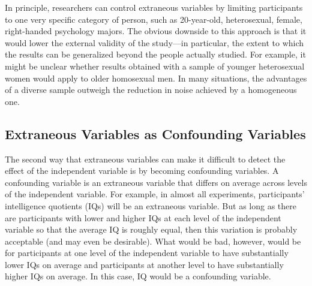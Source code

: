 In principle, researchers can control extraneous variables by limiting participants to one very specific category of person, such as 20-year-old, heterosexual, female, right-handed psychology majors. The obvious downside to this approach is that it would lower the external validity of the study---in particular, the extent to which the results can be generalized beyond the people actually studied. For example, it might be unclear whether results obtained with a sample of younger heterosexual women would apply to older homosexual men. In many situations, the advantages of a diverse sample outweigh the reduction in noise achieved by a homogeneous one.

\subsection{Extraneous Variables as Confounding Variables}

The second way that extraneous variables can make it difficult to detect the effect of the independent variable is by becoming confounding variables. A confounding variable is an extraneous variable that differs on average across levels of the independent variable. For example, in almost all experiments, participants' intelligence quotients (IQs) will be an extraneous variable. But as long as there are participants with lower and higher IQs at each level of the independent variable so that the average IQ is roughly equal, then this variation is probably acceptable (and may even be desirable). What would be bad, however, would be for participants at one level of the independent variable to have substantially lower IQs on average and participants at another level to have substantially higher IQs on average. In this case, IQ would be a confounding variable.

